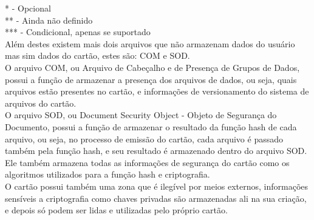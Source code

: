 \documentclass{article}
\begin{document}
\begin{justify}
			\hspace*{1.5cm} * - Opcional\\
			\hspace*{2cm} ** - Ainda não definido\\
			\hspace*{2cm} *** - Condicional, apenas se suportado\\
			
			\hspace*{2cm}Além destes existem mais dois arquivos que não armazenam dados do usuário mas sim dados do cartão, estes são: COM e SOD.\\
			\hspace*{2cm} O arquivo COM, ou Arquivo de Cabeçalho e de Presença de Grupos de Dados, possui a função de armazenar a presença dos arquivos de dados, ou seja, quais arquivos estão presentes no cartão, e informações de versionamento do sistema de arquivos do cartão. \\
			\hspace*{2cm} O arquivo SOD, ou Document Security Object - Objeto de Segurança do Documento, possui a função de armazenar o resultado da função hash de cada arquivo, ou seja, no processo de emissão do cartão, cada arquivo é passado também pela função hash, e seu resultado é armazenado dentro do arquivo SOD. Ele também armazena todas as informações de segurança do cartão como os algoritmos utilizados para a função hash e criptografia.\\
			\hspace*{2cm} O cartão possui também uma zona que é ilegível por meios externos, informações sensíveis a criptografia como chaves privadas são armazenadas ali na sua criação, e depois só podem ser lidas e utilizadas pelo próprio cartão.
		\end{justify}
\end{document}
